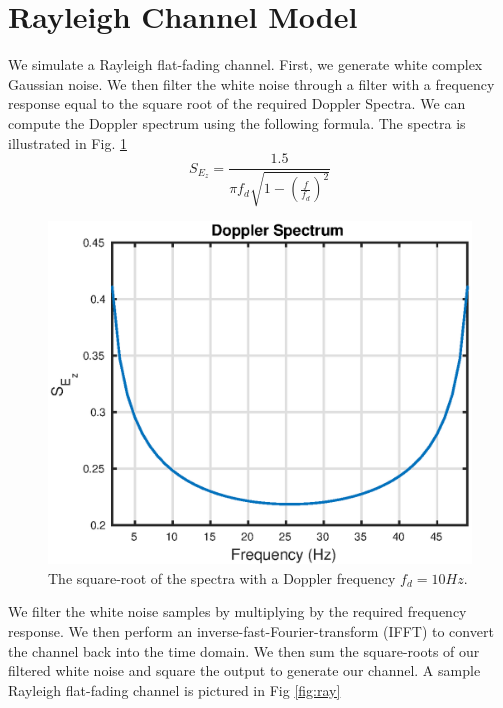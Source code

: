 \documentclass[conference]{IEEEtran}
\begin{document}
\section{Rayleigh Channel Model}
We simulate a Rayleigh flat-fading channel. First, we generate white complex Gaussian noise. We then filter the white noise through a filter with a frequency response equal to the square root of the required Doppler Spectra. We can compute the Doppler spectrum using the following formula. The spectra is illustrated in Fig. \ref{fig:dop}
\begin{equation}
S_{E_z} = \frac{1.5}{\pi f_d\sqrt{1-\left(\frac{f}{f_d} \right)^2}}
\end{equation}
\begin{figure}[htbp]
\centerline{\includegraphics[scale=.5]{./media/doppler.eps}}
\caption{The square-root of the spectra with a Doppler frequency $f_d = 10Hz$. }
\label{fig:dop}
\end{figure}
We filter the white noise samples by multiplying by the required frequency response. We then perform an inverse-fast-Fourier-transform (IFFT) to convert the channel back into the time domain. We then sum the square-roots of our filtered white noise and square the output to generate our channel. A sample Rayleigh flat-fading channel is pictured in Fig \ref{fig:ray}
\end{document}
